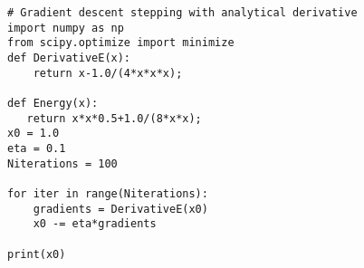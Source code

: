 \documentclass[%
oneside,                 %
final,                   %
10pt]{article}
\begin{document}
\begin{verbatim}
# Gradient descent stepping with analytical derivative
import numpy as np
from scipy.optimize import minimize
def DerivativeE(x):
    return x-1.0/(4*x*x*x);

def Energy(x):
   return x*x*0.5+1.0/(8*x*x);
x0 = 1.0
eta = 0.1
Niterations = 100

for iter in range(Niterations):
    gradients = DerivativeE(x0)
    x0 -= eta*gradients

print(x0)

\end{verbatim}
\end{document}
